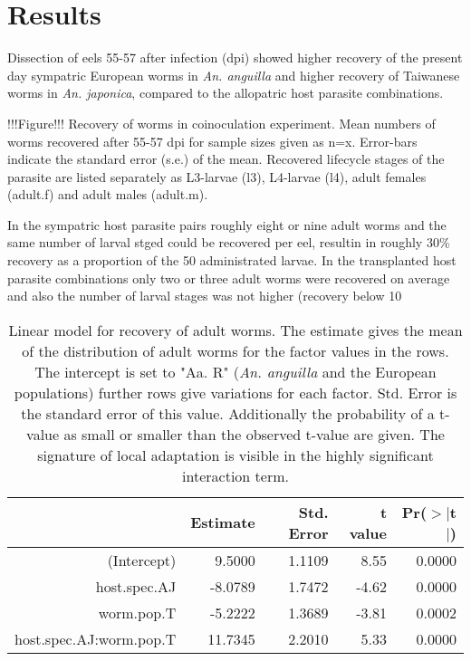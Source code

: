 \documentclass[10pt]{article}
\begin{document}
\section{Results}

Dissection of eels 55-57 after infection (dpi) showed higher recovery
of the present day sympatric European worms in \textit{An. anguilla}
and higher recovery of Taiwanese worms in \textit{An. japonica},
compared to the allopatric host parasite combinations.

!!!Figure!!! Recovery of worms in coinoculation experiment. Mean
numbers of worms recovered after 55-57 dpi for sample sizes given as
n=x. Error-bars indicate the standard error (s.e.) of the
mean. Recovered lifecycle stages of the parasite are listed separately
as L3-larvae (l3), L4-larvae (l4), adult females (adult.f) and adult
males (adult.m).

In the sympatric host parasite pairs roughly eight or nine adult worms
and the same number of larval stged could be recovered per eel,
resultin in roughly 30\% recovery as a proportion of the 50
administrated larvae. In the transplanted host parasite combinations
only two or three adult worms were recovered on average and also the
number of larval stages was not higher (recovery below 10%

\begin{table}[h]
\begin{center}
\begin{tabular}{rrrrr}
  \hline
 & Estimate & Std. Error & t value & Pr($>$$|$t$|$) \\ 
  \hline
  (Intercept) & 9.5000 & 1.1109 & 8.55 & 0.0000 \\ 
  host.spec.AJ & -8.0789 & 1.7472 & -4.62 & 0.0000 \\ 
  worm.pop.T & -5.2222 & 1.3689 & -3.81 & 0.0002 \\ 
  host.spec.AJ:worm.pop.T & 11.7345 & 2.2010 & 5.33 & 0.0000 \\ 
   \hline
\end{tabular}

\caption[Linear model for recovery]{Linear model for recovery of adult
  worms. The estimate gives the mean of the distribution of adult
  worms for the factor values in the rows. The intercept is set to
  "Aa. R" (\textit{An. anguilla} and the European populations) further
  rows give variations for each factor. Std. Error is the standard
  error of this value. Additionally the probability of a t-value as
  small or smaller than the observed t-value are given. The signature
  of local adaptation is visible in the highly significant interaction
  term.}
\label{tab:ad-sig}
\end{center}
\end{table}
\end{document}
